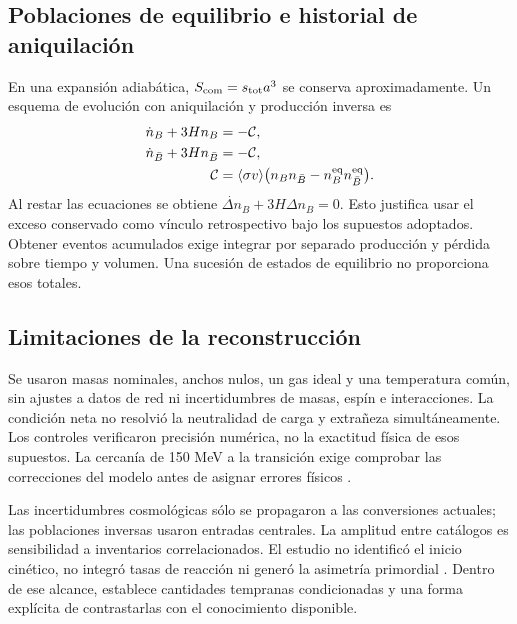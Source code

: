 \subsection{Poblaciones de equilibrio e historial de aniquilación}
En una expansión adiabática, $S_{\rm com}=s_{\mathrm{tot}} a^3$ se conserva aproximadamente. Un esquema de evolución con aniquilación y producción inversa es \citep{Satarov2013}
\begin{align}
\dot n_B+3Hn_B&=-\mathcal C,\\
\dot n_{\bar B}+3Hn_{\bar B}&=-\mathcal C,\\
\mathcal C&=\langle\sigma v\rangle
\bigl(n_Bn_{\bar B}-n_B^{\rm eq}n_{\bar B}^{\rm eq}\bigr).
\end{align}
Al restar las ecuaciones se obtiene $\dot{\Delta n}_B+3H\Delta n_B=0$. Esto justifica usar el exceso conservado como vínculo retrospectivo bajo los supuestos adoptados. Obtener eventos acumulados exige integrar por separado producción y pérdida sobre tiempo y volumen. Una sucesión de estados de equilibrio no proporciona esos totales.

\subsection{Limitaciones de la reconstrucción}
Se usaron masas nominales, anchos nulos, un gas ideal y una temperatura común, sin ajustes a datos de red ni incertidumbres de masas, espín e interacciones. La condición neta no resolvió la neutralidad de carga y extrañeza simultáneamente. Los controles verificaron precisión numérica, no la exactitud física de esos supuestos. La cercanía de 150 MeV a la transición exige comprobar las correcciones del modelo antes de asignar errores físicos \citep{Bazavov2012}.

Las incertidumbres cosmológicas sólo se propagaron a las conversiones actuales; las poblaciones inversas usaron entradas centrales. La amplitud entre catálogos es sensibilidad a inventarios correlacionados. El estudio no identificó el inicio cinético, no integró tasas de reacción ni generó la asimetría primordial \citep{Sakharov1967}. Dentro de ese alcance, establece cantidades tempranas condicionadas y una forma explícita de contrastarlas con el conocimiento disponible.
